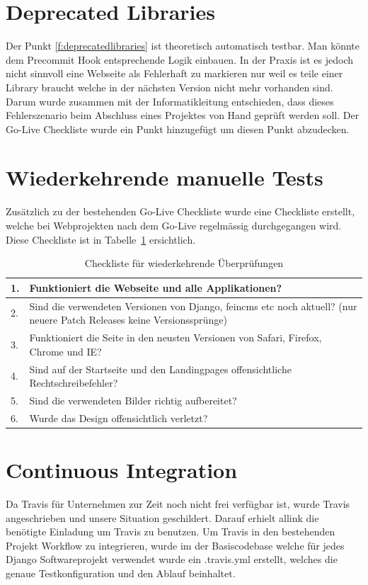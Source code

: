 
\section{Deprecated Libraries}
\label{sec:deprecated_libraries}
Der Punkt \ref{f:deprecatedlibraries} ist theoretisch automatisch testbar. Man könnte dem Precommit Hook entsprechende Logik einbauen. In der Praxis ist es jedoch nicht sinnvoll eine Webseite als Fehlerhaft zu markieren nur weil es teile einer Library braucht welche in der nächsten Version nicht mehr vorhanden sind. Darum wurde zusammen mit der Informatikleitung entschieden, dass dieses Fehlerszenario beim Abschluss eines Projektes von Hand geprüft werden soll. Der Go-Live Checkliste wurde ein Punkt hinzugefügt um diesen Punkt abzudecken.

\section{Wiederkehrende manuelle Tests}
\label{sec:wiederkehrende_manuelle_tests}
Zusätzlich zu der bestehenden Go-Live Checkliste wurde eine Checkliste erstellt, welche bei Webprojekten nach dem Go-Live regelmässig durchgegangen wird. Diese Checkliste ist in Tabelle~\ref{tab:recuring_checklist} ersichtlich.

\begin{table}[ht]
  \centering
  \begin{tabular}{l p{10cm}}
  \toprule
    1. & Funktioniert die Webseite und alle Applikationen?\\
  \hline
    2. & Sind die verwendeten Versionen von Django, feincms etc noch aktuell? (nur neuere Patch Releases keine Versionssprünge)\\
  \hline
    3. & Funktioniert die Seite in den neusten Versionen von Safari, Firefox, Chrome und IE?\\
  \hline
    4. & Sind auf der Startseite und den Landingpages offensichtliche Rechtschreibefehler?\\
  \hline
    5. & Sind die verwendeten Bilder richtig aufbereitet?\\
  \hline
    6. & Wurde das Design offensichtlich verletzt?\\
  \bottomrule
  \end{tabular}
  \caption{Checkliste für wiederkehrende Überprüfungen}
  \label{tab:recuring_checklist}
\end{table}

\section{Continuous Integration}
\label{sec:continuous_integration_proof_of_concept}
Da Travis für Unternehmen zur Zeit noch nicht frei verfügbar ist, wurde Travis angeschrieben und unsere Situation geschildert. Darauf erhielt allink die benötigte Einladung um Travis zu benutzen.
Um Travis in den bestehenden Projekt Workflow zu integrieren, wurde im der Basiscodebase welche für jedes Django Softwareprojekt verwendet wurde ein .travis.yml erstellt, welches die genaue Testkonfiguration und den Ablauf beinhaltet.

